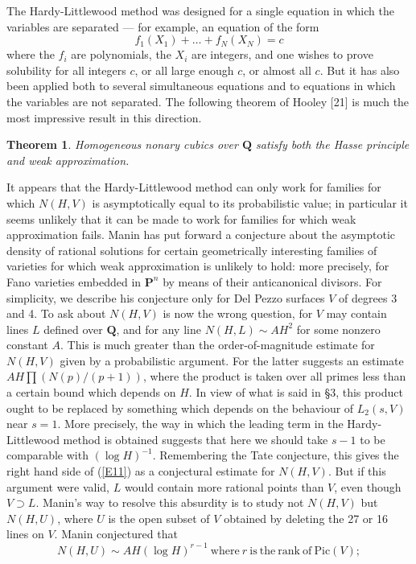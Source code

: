 \documentclass[12pt]{article}
\def\bP{{\mathbf P}}
\def\bQ{{\mathbf Q}}
\def\beq{\begin{equation} \label}
\def\bth{\begin{theorem} \label}
\def\eth{\end{theorem}}
\newtheorem{theorem}{Theorem}
\begin{document}
The Hardy-Littlewood method was designed for a single equation in which the
variables are separated --- for example, an equation of the form
\[ f_1(X_1)+\ldots+f_N(X_N)=c \]
where the $f_i$ are polynomials, the $X_i$ are integers, and one wishes to
prove solubility for all integers $c$, or all large enough $c$, or almost all
$c$. But it has also been applied both to several simultaneous equations and
to equations in which the variables are not separated. The following theorem
of Hooley [21] is much the most impressive result in this direction.
\bth{T4} Homogeneous nonary cubics over $\bQ$ satisfy both the Hasse
principle and weak approximation.
\eth

It appears that the Hardy-Littlewood method can only work for families for
which $N(H,V)$ is asymptotically equal to its probabilistic value; in
particular it seems unlikely that it can be made to work for families for
which weak approximation fails. Manin has put forward a conjecture about the
asymptotic density of rational solutions for certain geometrically interesting
families of varieties for which weak approximation is unlikely to hold: more
precisely, for Fano varieties embedded in $\bP^n$ by means of
their anticanonical divisors. For simplicity, we describe his conjecture only
for Del Pezzo surfaces $V$ of degrees 3 and 4.
To ask about $N(H,V)$ is now the wrong question,
for $V$ may contain lines $L$ defined over $\bQ$, and for any
line $N(H,L)\sim AH^2$ for some nonzero constant $A$. This is much greater
than the order-of-magnitude estimate for $N(H,V)$ given by a
probabilistic argument. For the latter suggests an estimate
$AH\prod(N(p)/(p+1))$, where the product is taken over all primes less than
a certain bound which depends on $H$. In view of what is said in \S3,
this product ought to be
replaced by something which depends on the behaviour of $L_2(s,V)$
near $s=1$. More precisely, the way in which the leading term in the
Hardy-Littlewood method is obtained suggests that here we should take
$s-1$ to be comparable with $(\log H)^{-1}$. Remembering the
Tate conjecture, this gives the right hand side of (\ref{E11}) as a
conjectural estimate for $N(H,V)$. But if this argument were valid, $L$
would contain more rational points than $V$, even though $V\supset L$.
Manin's way to resolve this absurdity is to study not $N(H,V)$ but $N(H,U)$,
where
$U$ is the open subset of $V$ obtained by deleting the 27 or 16 lines on $V$.
Manin conjectured that
\beq{E11} N(H,U)\sim AH(\log H)^{r-1} {\mathrm{~where~}} r
{\mathrm{~is~the~rank~ of~Pic}}(V); \end{equation}
\end{document}
